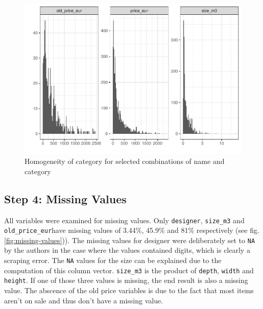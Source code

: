 \documentclass[a4paper, nobind]{templates/ociamthesis}
\begin{document}
\begin{figure}
\includegraphics[width=1\linewidth]{_main_files/figure-latex/normality-1} \caption{Homogeneity of category for selected combinations of name and category}\label{fig:normality}
\end{figure}

\hypertarget{step-4-missing-values}{%
\subsection{Step 4: Missing Values}\label{step-4-missing-values}}

All variables were examined for missing values. Only \texttt{designer}, \texttt{size\_m3} and \texttt{old\_price\_eur}have missing values of 3.44\%, 45.9\% and 81\% respectively (see fig. \ref{fig:missing-values})).
The missing values for designer were deliberately set to \texttt{NA} by the authors in the case where the values contained digits, which is clearly a scraping error.
The \texttt{NA} values for the size can be explained due to the computation of this column vector. \texttt{size\_m3} is the product of \texttt{depth}, \texttt{width} and \texttt{height}. If one of those three values is missing, the end result is also a missing value.
The abscence of the old price variables is due to the fact that most items aren't on sale and thus don't have a missing value.
\end{document}
